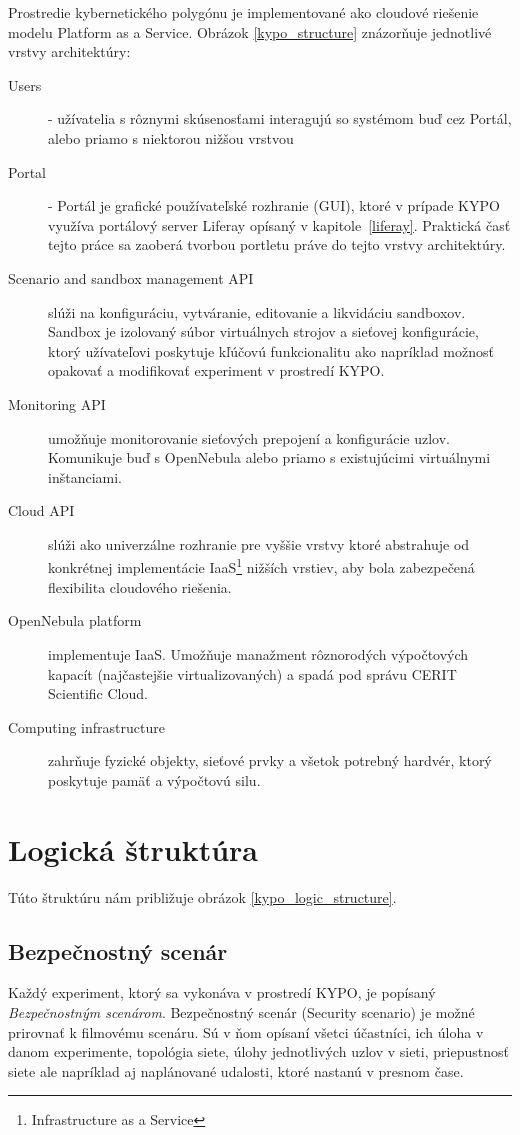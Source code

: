 \documentclass[
  digital, %
  twoside, %
  notable,   %
  nolof,   %
  nolot,   %
]{fithesis3}
\begin{document}
Prostredie kybernetického polygónu je implementované ako cloudové riešenie modelu Platform as a Service. Obrázok \ref{kypo_structure} znázorňuje jednotlivé vrstvy architektúry:

\begin{description}
\item[Users] - užívatelia s rôznymi skúsenosťami interagujú so systémom buď cez Portál, alebo priamo s niektorou nižšou vrstvou
\item[Portal] - Portál je grafické používateľské rozhranie (GUI), ktoré v prípade KYPO využíva portálový server Liferay opísaný v kapitole~\ref{liferay}. Praktická časť tejto práce sa zaoberá tvorbou portletu práve do tejto vrstvy architektúry.
\item[Scenario and sandbox management API] slúži na konfiguráciu, vytváranie, editovanie a likvidáciu sandboxov. Sandbox je izolovaný súbor virtuálnych strojov a sieťovej konfigurácie, ktorý užívateľovi poskytuje kľúčovú funkcionalitu ako napríklad možnosť opakovať a modifikovať experiment v prostredí KYPO.
\item[Monitoring API] umožňuje monitorovanie sieťových prepojení a konfigurácie uzlov. Komunikuje buď s OpenNebula alebo priamo s existujúcimi virtuálnymi inštanciami.
\item[Cloud API] slúži ako univerzálne rozhranie pre vyššie vrstvy ktoré abstrahuje od konkrétnej implementácie IaaS\footnote{Infrastructure as a Service} nižších vrstiev, aby bola zabezpečená flexibilita cloudového riešenia.
\item[OpenNebula platform] implementuje IaaS\cite{sempolinski2010comparison}. Umožňuje manažment rôznorodých výpočtových kapacít (najčastejšie virtualizovaných) a spadá pod správu CERIT Scientific Cloud.
\item[Computing infrastructure] zahrňuje fyzické objekty, sieťové prvky a všetok potrebný hardvér, ktorý poskytuje pamäť a výpočtovú silu.
\end{description}

\section{Logická štruktúra}
Túto štruktúru nám približuje obrázok \ref{kypo_logic_structure}.

\subsection{Bezpečnostný scenár}
Každý experiment, ktorý sa vykonáva v prostredí KYPO, je popísaný \textit{Bezpečnostným scenárom}. Bezpečnostný scenár (Security scenario) je možné prirovnať k filmovému scenáru. Sú v ňom opísaní všetci účastníci, ich úloha v danom experimente, topológia siete, úlohy jednotlivých uzlov v sieti, priepustnosť siete ale napríklad aj naplánované udalosti, ktoré nastanú v presnom čase\cite{eichler2014analytical, eichler2015kypo}.
\end{document}
